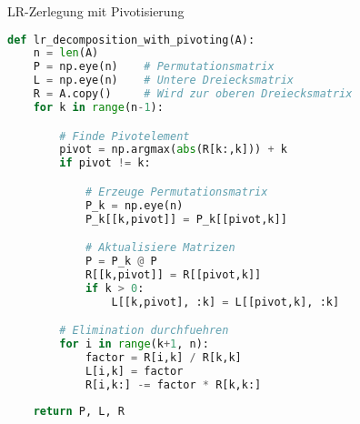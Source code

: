 \begin{examplecode}{LR-Zerlegung mit Pivotisierung}
\begin{lstlisting}[language=Python, style=basesmol]
def lr_decomposition_with_pivoting(A):
    n = len(A)
    P = np.eye(n)    # Permutationsmatrix
    L = np.eye(n)    # Untere Dreiecksmatrix
    R = A.copy()     # Wird zur oberen Dreiecksmatrix
    for k in range(n-1):

        # Finde Pivotelement
        pivot = np.argmax(abs(R[k:,k])) + k
        if pivot != k:

            # Erzeuge Permutationsmatrix
            P_k = np.eye(n)
            P_k[[k,pivot]] = P_k[[pivot,k]]

            # Aktualisiere Matrizen
            P = P_k @ P
            R[[k,pivot]] = R[[pivot,k]]
            if k > 0:
                L[[k,pivot], :k] = L[[pivot,k], :k]

        # Elimination durchfuehren
        for i in range(k+1, n):
            factor = R[i,k] / R[k,k]
            L[i,k] = factor
            R[i,k:] -= factor * R[k,k:]
            
    return P, L, R
\end{lstlisting}
\end{examplecode}

